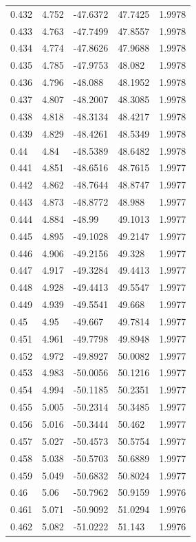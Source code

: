 \begin{tabular}{lllll}
0.432 & 4.752 & -47.6372 & 47.7425 & 1.9978 \\
0.433 & 4.763 & -47.7499 & 47.8557 & 1.9978 \\
0.434 & 4.774 & -47.8626 & 47.9688 & 1.9978 \\
0.435 & 4.785 & -47.9753 & 48.082 & 1.9978 \\
0.436 & 4.796 & -48.088 & 48.1952 & 1.9978 \\
0.437 & 4.807 & -48.2007 & 48.3085 & 1.9978 \\
0.438 & 4.818 & -48.3134 & 48.4217 & 1.9978 \\
0.439 & 4.829 & -48.4261 & 48.5349 & 1.9978 \\
0.44 & 4.84 & -48.5389 & 48.6482 & 1.9978 \\
0.441 & 4.851 & -48.6516 & 48.7615 & 1.9977 \\
0.442 & 4.862 & -48.7644 & 48.8747 & 1.9977 \\
0.443 & 4.873 & -48.8772 & 48.988 & 1.9977 \\
0.444 & 4.884 & -48.99 & 49.1013 & 1.9977 \\
0.445 & 4.895 & -49.1028 & 49.2147 & 1.9977 \\
0.446 & 4.906 & -49.2156 & 49.328 & 1.9977 \\
0.447 & 4.917 & -49.3284 & 49.4413 & 1.9977 \\
0.448 & 4.928 & -49.4413 & 49.5547 & 1.9977 \\
0.449 & 4.939 & -49.5541 & 49.668 & 1.9977 \\
0.45 & 4.95 & -49.667 & 49.7814 & 1.9977 \\
0.451 & 4.961 & -49.7798 & 49.8948 & 1.9977 \\
0.452 & 4.972 & -49.8927 & 50.0082 & 1.9977 \\
0.453 & 4.983 & -50.0056 & 50.1216 & 1.9977 \\
0.454 & 4.994 & -50.1185 & 50.2351 & 1.9977 \\
0.455 & 5.005 & -50.2314 & 50.3485 & 1.9977 \\
0.456 & 5.016 & -50.3444 & 50.462 & 1.9977 \\
0.457 & 5.027 & -50.4573 & 50.5754 & 1.9977 \\
0.458 & 5.038 & -50.5703 & 50.6889 & 1.9977 \\
0.459 & 5.049 & -50.6832 & 50.8024 & 1.9977 \\
0.46 & 5.06 & -50.7962 & 50.9159 & 1.9976 \\
0.461 & 5.071 & -50.9092 & 51.0294 & 1.9976 \\
0.462 & 5.082 & -51.0222 & 51.143 & 1.9976 \\

\end{tabular}
